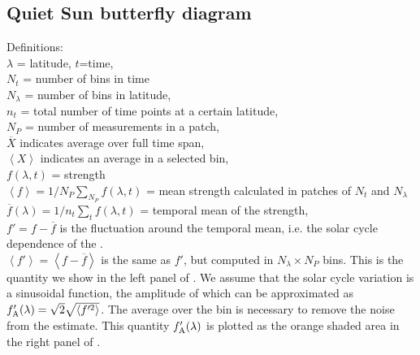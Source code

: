 \documentclass{aa}
\begin{document}
\subsection{Quiet Sun \fff butterfly diagram}\label{qsf}



Definitions:\\
$\lambda$ = latitude, $t$=time, \\
$N_t$ = number of bins in time \\
$N_\lambda$ = number of bins in latitude, \\
$n_t$ = total number of time points at a certain latitude, \\
$N_P$ = number of \fff measurements in a patch, \\
$\overline{X}$ indicates average over full time span, \\
$\left< X \right>$ indicates an average in a selected bin, \\
$f(\lambda,t)$ = \fff strength \\
$\left< f \right>=1/N_P \sum_{N_P} f (\lambda,t)$ = mean \fff strength calculated in patches of $N_t$ and $N_\lambda$ \\
$\overline{f}(\lambda) = 1/n_t \sum_t f(\lambda,t)$ = temporal mean of the \fff strength, \\
$f'=f-\overline{f}$ is the fluctuation around the temporal mean, i.e. the solar cycle dependence of the \fff.\\
$\left< f' \right> = \left< f - \overline{f} \right> $ is the same as $f'$, but computed in $N_\lambda \times N_P$ bins. This is the quantity we show in the left panel of .
We assume that the solar cycle variation is a sinusoidal function, the amplitude of which can be approximated as 
$f'_{\rm A} (\lambda) = 
\sqrt{2} \sqrt{\left<{f'^2}\right>}$. 
The average over the bin is necessary to remove the noise from the estimate.
This quantity $f'_{\rm A} (\lambda)$ is plotted as the orange shaded area in the right panel of .
\end{document}
